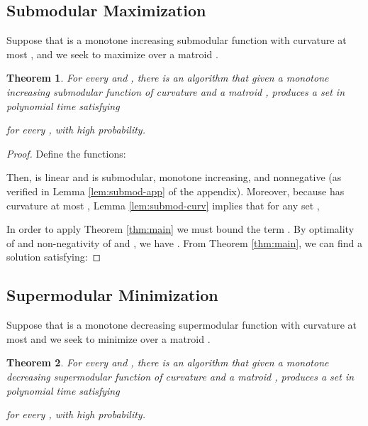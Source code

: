 \documentclass{article}
\newtheorem{theorem}{Theorem}[section]
\theoremstyle{definition}
\begin{document}
\subsection{Submodular Maximization}
\label{sec:subm-maxim}

Suppose that  is a monotone increasing submodular function with curvature at most , and we seek to maximize  over a matroid . 

\begin{theorem}
\label{thm:submod-main}
For every  and , there is an algorithm that given a monotone increasing submodular function  of curvature  and a matroid , produces a set  in polynomial time satisfying

for every , with high probability.
\end{theorem}

\begin{proof}
Define the functions:

Then,  is linear and  is submodular, monotone increasing, and nonnegative (as verified in Lemma \ref{lem:submod-app} of the appendix).  Moreover, because  has curvature at most , Lemma \ref{lem:submod-curv} implies that for any set , 

In order to apply Theorem \ref{thm:main} we must bound the term .  By optimality of  and non-negativity of  and , we have .  From Theorem \ref{thm:main}, we can find a solution  satisfying:

\end{proof}


\subsection{Supermodular Minimization}
\label{sec:superm-minim}

Suppose that  is a monotone decreasing supermodular function with curvature at most  and we seek to minimize  over a matroid . 

\begin{theorem}
\label{thm:supermod-main}
For every  and , there is an algorithm that given a monotone decreasing supermodular function  of curvature  and a matroid , produces a set  in polynomial time satisfying

for every , with high probability.
\end{theorem}
\end{document}
